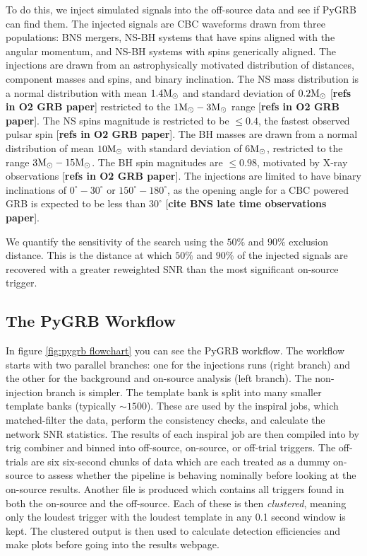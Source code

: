\documentclass[11pt]{cuthesis}
\begin{document}
To do this, we inject simulated signals into the off-source data and see if PyGRB can find them. The injected signals are CBC waveforms drawn from three populations: BNS mergers, NS-BH systems that have spins aligned with the angular momentum, and NS-BH systems with spins generically aligned. The injections are drawn from an astrophysically motivated distribution of distances, component masses and spins, and binary inclination. The NS mass distribution is a normal distribution with mean $1.4 \textup{M}_\odot$ and standard deviation of $0.2 \textup {M}_\odot$ [\textbf{refs in O2 GRB paper}] restricted to the $1 \textup{M}_\odot-3\textup {M}_\odot$ range [\textbf{refs in O2 GRB paper}]. The NS spins magnitude is restricted to be $\leq 0.4$, the fastest observed pulsar spin [\textbf{refs in O2 GRB paper}]. The BH masses are drawn from a normal distribution of mean $10 \textup{M}_\odot$ with standard deviation of 6$ \textup{M}_\odot$, restricted to the range $3 \textup{M}_\odot-15 \textup{M}_\odot$. The BH spin magnitudes are $\leq 0.98$, motivated by X-ray observations [\textbf{refs in O2 GRB paper}]. The injections are limited to have binary inclinations of $0^\circ-30^\circ$ or $150^\circ-180^\circ$, as the opening angle for a CBC powered GRB is expected to be less than $30^\circ$ [\textbf{cite BNS late time observations paper}]. 

We quantify the sensitivity of the search using the $50\%$ and $90\%$  exclusion distance. This is the distance at which $50\%$ and $90\%$ of the injected signals are recovered with a greater reweighted SNR than the most significant on-source trigger. 


\subsection{The PyGRB Workflow}
In figure \ref{fig:pygrb flowchart} you can see the PyGRB workflow. The workflow starts with two parallel branches: one for the injections runs (right branch) and the other for the background and on-source analysis (left branch). The non-injection branch is simpler. The template bank is split into many smaller template banks (typically $\sim 1500$). These are used by the inspiral jobs, which matched-filter the data, perform the consistency checks, and calculate the network SNR statistics. The results of each inspiral job are then compiled into by trig combiner and binned into off-source, on-source, or off-trial triggers. The off-trials are six six-second chunks of data which are each treated as a dummy on-source to assess whether the pipeline is behaving nominally before looking at the on-source results. Another file is produced which contains all triggers found in both the on-source and the off-source. Each of these is then \textit{clustered}, meaning only the loudest trigger with the loudest template in any 0.1 second window is kept. The clustered output is then used to calculate detection efficiencies and make plots before going into the results webpage. 
\end{document}
